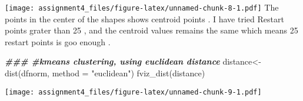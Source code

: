 \documentclass[
]{article}
\newenvironment{Shaded}{\begin{snugshade}}{\end{snugshade}}
\newcommand{\AttributeTok}[1]{\textcolor[rgb]{0.77,0.63,0.00}{#1}}
\newcommand{\CommentTok}[1]{\textcolor[rgb]{0.56,0.35,0.01}{\textit{#1}}}
\newcommand{\DecValTok}[1]{\textcolor[rgb]{0.00,0.00,0.81}{#1}}
\newcommand{\DocumentationTok}[1]{\textcolor[rgb]{0.56,0.35,0.01}{\textbf{\textit{#1}}}}
\newcommand{\FunctionTok}[1]{\textcolor[rgb]{0.00,0.00,0.00}{#1}}
\newcommand{\NormalTok}[1]{#1}
\newcommand{\OtherTok}[1]{\textcolor[rgb]{0.56,0.35,0.01}{#1}}
\newcommand{\SpecialCharTok}[1]{\textcolor[rgb]{0.00,0.00,0.00}{#1}}
\newcommand{\StringTok}[1]{\textcolor[rgb]{0.31,0.60,0.02}{#1}}
\begin{document}
\texttt{[image: assignment4\_files/figure-latex/unnamed-chunk-8-1.pdf]}
The points in the center of the shapes shows centroid points . I have
tried Restart points grater than 25 , and the centroid values remains
the same which means 25 restart points is goo enough .

\begin{Shaded}
\begin{Highlighting}[]
\DocumentationTok{\#\#\# \#kmeans clustering, using euclidean distance}
\NormalTok{distance}\OtherTok{\textless{}{-}} \FunctionTok{dist}\NormalTok{(dfnorm, }\AttributeTok{method =} \StringTok{"euclidean"}\NormalTok{) }
\FunctionTok{fviz\_dist}\NormalTok{(distance)}
\end{Highlighting}
\end{Shaded}

\texttt{[image: assignment4\_files/figure-latex/unnamed-chunk-9-1.pdf]}

\begin{Shaded}
\end{Shaded}
\end{document}
